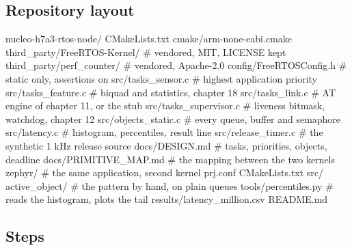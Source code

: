\subsection*{Repository layout}

\begin{plaincode}
nucleo-h7a3-rtos-node/
  CMakeLists.txt
  cmake/arm-none-eabi.cmake
  third_party/FreeRTOS-Kernel/       # vendored, MIT, LICENSE kept
  third_party/perf_counter/          # vendored, Apache-2.0
  config/FreeRTOSConfig.h            # static only, assertions on
  src/tasks_sensor.c                 # highest application priority
  src/tasks_feature.c                # biquad and statistics, chapter 18
  src/tasks_link.c                   # AT engine of chapter 11, or the stub
  src/tasks_supervisor.c             # liveness bitmask, watchdog, chapter 12
  src/objects_static.c               # every queue, buffer and semaphore
  src/latency.c                      # histogram, percentiles, result line
  src/release_timer.c                # the synthetic 1 kHz release source
  docs/DESIGN.md                     # tasks, priorities, objects, deadline
  docs/PRIMITIVE_MAP.md              # the mapping between the two kernels
  zephyr/                            # the same application, second kernel
    prj.conf  CMakeLists.txt  src/
  active_object/                     # the pattern by hand, on plain queues
  tools/percentiles.py               # reads the histogram, plots the tail
  results/latency_million.csv
  README.md
\end{plaincode}

\subsection*{Steps}

